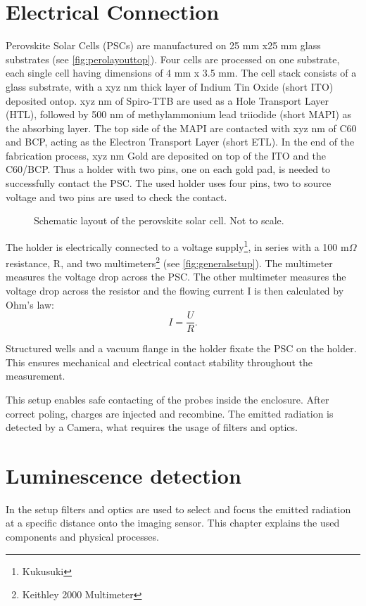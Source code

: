 \section{Electrical Connection}\label{sec:electricalconnection}
Perovskite Solar Cells (PSCs) are manufactured on 25 mm x25 mm glass substrates (see \autoref{fig:perolayouttop}). Four cells are processed on one substrate, each single cell having dimensions of 4 mm x 3.5 mm. The cell stack consists of a glass substrate, with a xyz nm thick layer of Indium Tin Oxide (short ITO) deposited ontop. xyz nm of Spiro-TTB are used as a Hole Transport Layer (HTL), followed by 500 nm of methylammonium lead triiodide (short MAPI) as the absorbing layer. The top side of the MAPI are contacted with xyz nm of C60 and BCP, acting as the Electron Transport Layer (short ETL). In the end of the fabrication process, xyz nm Gold are deposited on top of the ITO and the C60/BCP. Thus a holder with two pins, one on each gold pad, is needed to successfully contact the PSC. The used holder uses four pins, two to source voltage and two pins are used to check the contact.
\begin{figure}
	\centering
	
	\caption{Schematic layout of the perovskite solar cell. Not to scale.}
	\label{fig:perolayouttop}
\end{figure}

The holder is electrically connected to a voltage supply\footnote{Kukusuki}, in series with a 100 m$\Omega$ resistance, R, and two multimeters\footnote{Keithley 2000 Multimeter} (see \autoref{fig:generalsetup}). The multimeter measures the voltage drop across the PSC. The other multimeter measures the voltage drop across the resistor and the flowing current I is then calculated by Ohm's law:
\begin{equation}
	I = \frac{U}{R}.
\end{equation}

Structured wells and a vacuum flange in the holder fixate the PSC on the holder. This ensures mechanical and electrical contact stability throughout the measurement.

This setup enables safe contacting of the probes inside the enclosure. After correct poling, charges are injected and recombine. The emitted radiation is detected by a Camera, what requires the usage of filters and optics.

\section{Luminescence detection}\label{sec:luminescencedetection}
In the setup filters and optics are used to select and focus the emitted radiation at a specific distance onto the imaging sensor. This chapter explains the used components and physical processes.
